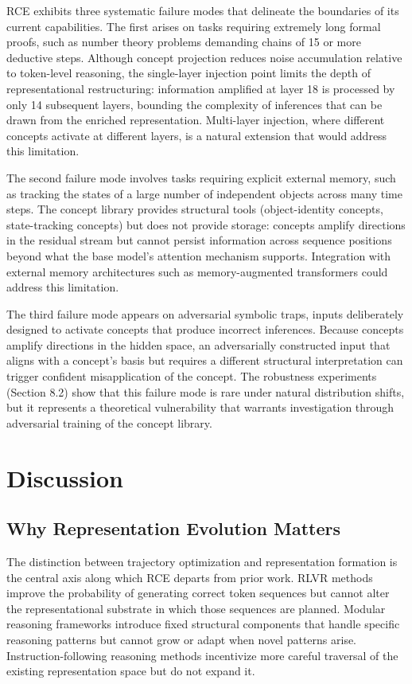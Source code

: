 \documentclass[11pt]{article}
\begin{document}
RCE exhibits three systematic failure modes that delineate the boundaries of its current capabilities. The first arises on tasks requiring extremely long formal proofs, such as number theory problems demanding chains of 15 or more deductive steps. Although concept projection reduces noise accumulation relative to token-level reasoning, the single-layer injection point limits the depth of representational restructuring: information amplified at layer 18 is processed by only 14 subsequent layers, bounding the complexity of inferences that can be drawn from the enriched representation. Multi-layer injection, where different concepts activate at different layers, is a natural extension that would address this limitation.

The second failure mode involves tasks requiring explicit external memory, such as tracking the states of a large number of independent objects across many time steps. The concept library provides structural tools (object-identity concepts, state-tracking concepts) but does not provide storage: concepts amplify directions in the residual stream but cannot persist information across sequence positions beyond what the base model's attention mechanism supports. Integration with external memory architectures such as memory-augmented transformers \cite{wu2022memorizing} could address this limitation.

The third failure mode appears on adversarial symbolic traps, inputs deliberately designed to activate concepts that produce incorrect inferences. Because concepts amplify directions in the hidden space, an adversarially constructed input that aligns with a concept's basis but requires a different structural interpretation can trigger confident misapplication of the concept. The robustness experiments (Section 8.2) show that this failure mode is rare under natural distribution shifts, but it represents a theoretical vulnerability that warrants investigation through adversarial training of the concept library.

\section{Discussion}

\subsection{Why Representation Evolution Matters}

The distinction between trajectory optimization and representation formation is the central axis along which RCE departs from prior work. RLVR methods \cite{ye2025enigmata,shao2024deepseekmath} improve the probability of generating correct token sequences but cannot alter the representational substrate in which those sequences are planned. Modular reasoning frameworks \cite{wang2025muslr} introduce fixed structural components that handle specific reasoning patterns but cannot grow or adapt when novel patterns arise. Instruction-following reasoning methods \cite{qu2025raif} incentivize more careful traversal of the existing representation space but do not expand it.
\end{document}
